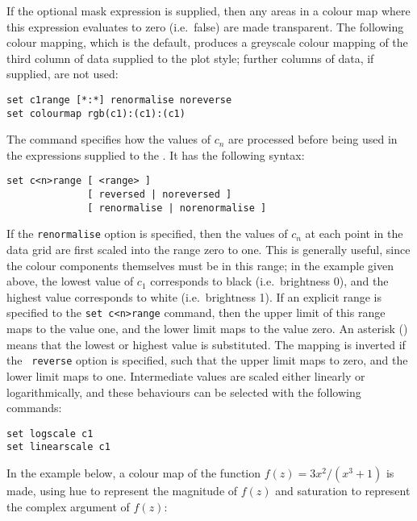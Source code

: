 \noindent If the optional mask expression is supplied, then any areas in a
colour map where this expression evaluates to zero (i.e.\ false) are made
transparent. The following colour mapping, which is the default, produces a
greyscale colour mapping of the third column of data supplied to the
 plot style; further columns of data, if supplied, are not
used:

\begin{verbatim}
set c1range [*:*] renormalise noreverse
set colourmap rgb(c1):(c1):(c1)
\end{verbatim}

The  command specifies how the values of $c_n$ are
processed before being used in the expressions supplied to the . It has the following syntax:

\begin{verbatim}
set c<n>range [ <range> ]
              [ reversed | noreversed ]
              [ renormalise | norenormalise ]
\end{verbatim}

\noindent If the {\tt renor\-malise} option is specified, then the values of
$c_n$ at each point in the data grid are first scaled into the range zero to
one. This is generally useful, since the colour components themselves must be
in this range; in the example given above, the lowest value of $c_1$
corresponds to black (i.e.\ brightness 0), and the highest value corresponds to
white (i.e.\ brightness 1). If an explicit range is specified to the {\tt set
c<n>range} command, then the upper limit of this range maps to the value one,
and the lower limit maps to the value zero. An asterisk ({\tt *}) means that
the lowest or highest value is substituted. The mapping is inverted if the {\tt
reverse} option is specified, such that the upper limit maps to zero, and the
lower limit maps to one.  Intermediate values are scaled either linearly or
logarithmically, and these behaviours can be selected with the following
commands:
\begin{verbatim}
set logscale c1
set linearscale c1
\end{verbatim}

In the example below, a colour map of the function $f(z)=3x^2/(x^3+1)$ is made,
using hue to represent the magnitude of $f(z)$ and saturation to represent the
complex argument of $f(z)$:

\newline
{}\newline
{}\newline
{}\newline
{}\newline
{}\newline
{}\newline
{}\newline
{}

